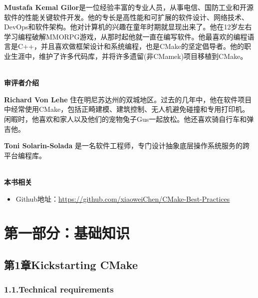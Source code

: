 \documentclass[11pt,a4paper,UTF8]{book}
\begin{document}
\begin{sloppypar}
	\textbf{Mustafa Kemal Gilor}是一位经验丰富的专业人员，从事电信、国防工业和开源软件的性能关键软件开发。他的专长是高性能和可扩展的软件设计、网络技术、DevOps和软件架构。他对计算机的兴趣在童年时期就显现出来了。他在12岁左右学习编程破解MMORPG游戏，从那时起他就一直在编写软件。他最喜欢的编程语言是C++，并且喜欢做框架设计和系统编程，也是CMake的坚定倡导者。他的职业生涯中，维护了许多代码库，并将许多遗留(非CMamek)项目移植到CMake。
	
	\hspace*{\fill} \\ %
	\noindent\textbf{审评者介绍}
	
	\textbf{Richard Von Lehe} 住在明尼苏达州的双城地区。过去的几年中，他在软件项目中经常使用CMake，包括正畸建模、建筑控制、无人机避免碰撞和专用打印机。闲暇时，他喜欢和家人以及他们的宠物兔子Gus一起放松。他还喜欢骑自行车和弹吉他。
	
	\textbf{Toni Solarin-Solada} 是一名软件工程师，专门设计抽象底层操作系统服务的跨平台编程库。
	
	
	\hspace*{\fill} \\ %
	\noindent\textbf{本书相关}
	\begin{itemize}
	\item Github地址：\url{https://github.com/xiaoweiChen/CMake-Best-Practices}
	\end{itemize}
	\newpage
	
	\pagestyle{empty}
	
	\newpage
	
	\tableofcontents
	\newpage

	
	\color{white}
	\section*{第一部分：基础知识}
	\pagecolor{mygray}
	\textbf{}
	\newpage
	\color{black}
	\pagecolor{white}

	\subsection*{ 第1章\hspace{0.5cm}Kickstarting CMake}
	
	
	\subsubsection*{ 1.1.\hspace{0.2cm}Technical requirements}
	
	

\end{sloppypar}
\end{document}

